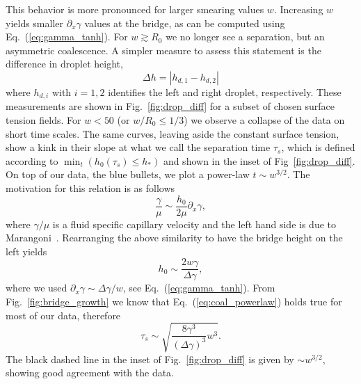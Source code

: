 This behavior is more pronounced for larger smearing values $w$.
Increasing $w$ yields smaller $\partial_x\gamma$ values at the bridge, as can be computed using Eq.~(\ref{eq:gamma_tanh}). 
For $w\gtrsim R_0$ we no longer see a separation, but an asymmetric coalescence.
A simpler measure to assess this statement is the difference in droplet height,
\begin{equation}\label{eq:drop_diff_h}
    \Delta h = \left|h_{d,1} - h_{d,2}\right|
\end{equation}
where $h_{d,i}$ with $i=1,2$ identifies the left and right droplet, respectively.
These measurements are shown in Fig.~\ref{fig:drop_diff} for a subset of chosen surface tension fields.
For $w < 50$ (or $w/R_0 \le 1/3$) we observe a collapse of the data on short time scales.
The same curves, leaving aside the constant surface tension, show a kink in their slope at what we call the separation time $\tau_s$, which is defined according to $\min_t(h_0(\tau_{s}) \le h_{\ast})$ and shown in the inset of Fig~\ref{fig:drop_diff}.
On top of our data, the blue bullets, we plot a power-law $t \sim w^{3/2}$.
The motivation for this relation is as follows
\begin{equation}\label{eq:velsim1}
    \frac{\gamma}{\mu} \sim \frac{h_0}{2\mu}\partial_x\gamma,
\end{equation}
where $\gamma/\mu$ is a fluid specific capillary velocity and the left hand side is due to Marangoni~\cite{aartsHydrodynamicsDropletCoalescence2005, doi:10.1021/la971292t}.
Rearranging the above similarity to have the bridge height on the left yields
\begin{equation}\label{velsim2}
    h_0 \sim \frac{2w\gamma}{\Delta\gamma},
\end{equation}
where we used $\partial_x\gamma \sim \Delta\gamma/w$, see Eq.~(\ref{eq:gamma_tanh}).
From Fig.~\ref{fig:bridge_growth} we know that Eq.~(\ref{eq:coal_powerlaw}) holds true for most of our data, therefore
\begin{equation}\label{velsim3}
    \tau_s \sim \sqrt{\frac{8\gamma^3}{(\Delta\gamma)^3}w^3}.
\end{equation}
The black dashed line in the inset of Fig.~\ref{fig:drop_diff} is given by $\sim w^{3/2}$, showing good agreement with the data.


